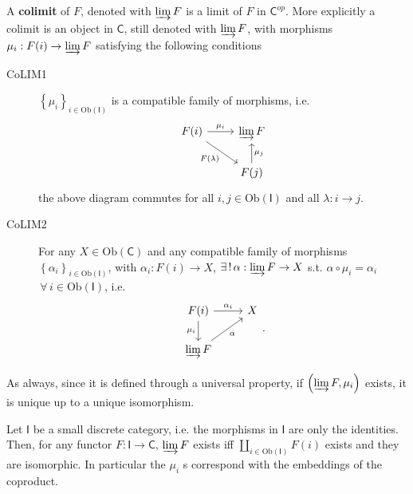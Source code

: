 \begin{defn}
	A \textbf{colimit} of $F$, denoted with $\varinjlim F$ is a limit of $F$ in $\mathsf{C}^{op}$.
	More explicitly a colimit is an object in $\mathsf{C}$, still denoted with $\varinjlim F$, 
	with morphisms $\mu_i: F(i) \to \varinjlim F$ satisfying the following conditions
	\begin{description}
		\item[CoLIM1] $\left\{ \mu_i \right\}_{i \in \mathrm{Ob} \left(\mathsf{I}\right)}$ is a compatible family of morphisms, i.e.
			\begin{equation}
			\begin{tikzcd}
				F(i) \arrow[r, "\mu_i", rightarrow] \arrow[rd, "F(\lambda)"', rightarrow] &
				\varinjlim F \\
				&
				F(j) \arrow[u, "\mu_j"', rightarrow] 
			\end{tikzcd}
			\end{equation} 
			the above diagram commutes for all $i, j \in \mathrm{Ob} \left(\mathsf{I}\right)$ and all $\lambda: i \to j$.
		\item[CoLIM2] For any $X \in \mathrm{Ob} \left(\mathsf{C}\right)$ and any compatible family of morphisms
			$\left\{ \alpha_i \right\}_{i \in \mathrm{Ob} \left(\mathsf{I}\right)}$, 
			with $\alpha_i: F(i) \to X$, 
			$\exists\, !\, \alpha: \varinjlim F \to X$ s.t. 
			$\alpha \circ \mu_i = \alpha_i$ $\,\forall\, i \in \mathrm{Ob} \left(\mathsf{I}\right)$, i.e.
			\begin{equation}
			\begin{tikzcd}
				F(i) \arrow[r, "\alpha_i", rightarrow] \arrow[d, "\mu_i"', rightarrow] &
				X\\
				\varinjlim F \arrow[ru, "\alpha"', rightarrow]  
			\end{tikzcd}
			.\end{equation} 
	\end{description} 
\end{defn}

\begin{rem}
	As always, since it is defined through a universal property, if $\left(\varinjlim F, \mu_i \right)$ exists,
	it is unique up to a unique isomorphism.
\end{rem}

\begin{ex}
	Let $\mathsf{I}$ be a small discrete category, i.e. the morphisms in $\mathsf{I}$ are only the identities.
	Then, for any functor $F: \mathsf{I} \to \mathsf{C}$, $\varinjlim F$ exists iff
	$\coprod_{i \in \mathrm{Ob} \left(\mathsf{I}\right)} F(i)$ exists and they are isomorphic.
	In particular the $\mu_i$ s correspond with the embeddings of the coproduct.
\end{ex} 

